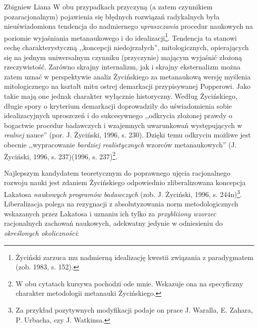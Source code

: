 \begin{artplenv}{Zbigniew Liana}
W obu przypadkach przyczyną (a zatem czynnikiem pozaracjonalnym) pojawienia się błędnych rozwiązań radykalnych była
nieuświadomiona tendencja do nadmiernego \textit{upraszczania} procedur naukowych na poziomie wyjaśniania
metanaukowego i do idealizacji\footnote{Życiński zarzuca mu nadmierną idealizację kwestii związania z paradygmatem
\label{ref:RNDIrA1jDg11P}(zob. 1983, s. 152).}. Tendencja ta stanowi cechę charakterystyczną ,,koncepcji niedojrzałych'',
mitologicznych, opierających się na jednym uniwersalnym czynniku (przyczynie) mającym wyjaśnić złożoną rzeczywistość.
Zarówno skrajny internalizm, jak i skrajny eksternalizm można zatem uznać w perspektywie analiz Życińskiego za
metanaukową wersję myślenia mitologicznego na kształt mitu ostrej demarkacji przypisywanej Popperowi. Jako takie mają
one jednak charakter wyłącznie historyczny. Według Życińskiego, długie spory o kryterium demarkacji doprowadziły do
uświadomienia sobie idealizacyjnych uproszczeń i do sukcesywnego ,,odkrycia złożonej prawdy o bogactwie procedur
badawczych i wzajemnych uwarunkowań występujących w \textit{realnej} nauce'' \label{ref:RNDT7FuhQK2nh}(por. J. Życiński,
1996, s. 230). Dzięki temu odkryciu możliwe jest obecnie ,,wypracowanie \textit{bardziej realistycznych} wzorców
metanaukowych'' \label{ref:RND3dNAmoO0qC}(J. Życiński, 1996, s. 237)(1996, s. 237)\footnote{W obu cytatach kursywa
pochodzi ode mnie. Wskazuje ona na specyficzny charakter metodologii metanauki Życińskiego.}.

Najlepszym kandydatem teoretycznym do poprawnego ujęcia racjonalnego rozwoju nauki jest zdaniem Życińskiego odpowiednio
zliberalizowana koncepcja Lakatosa \textit{naukowych programów badawczych} \label{ref:RNDR4AQgoKDGC}(zob. J. Życiński,
1996, s. 244n)\footnote{Za przykład pozytywnych modyfikacji podaje on prace J. Waralla, E. Zahara, P. Urbacha, czy J.
Watkinsa.}. Liberalizacja polega na rezygnacji z absolutyzowania norm metodologicznych wskazanych przez
Lakatosa i uznaniu ich tylko za \textit{przybliżony wzorzec} racjonalnych zachowań naukowych, adekwatny
jedynie w odniesieniu do
\textit{określonych okoliczności}:


\end{artplenv}
